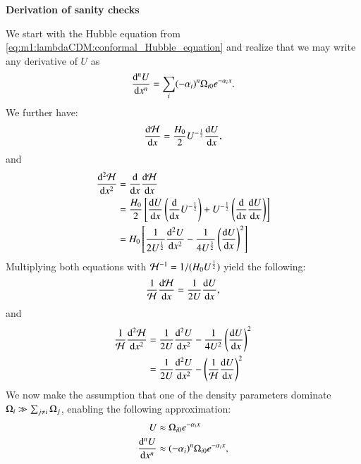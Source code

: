     \begin{tcolorbox}[
        width=1.025\linewidth,
        colback=blue!5!white,
        colframe=white
    ]
    \textbf{Derivation of sanity checks}

    We start with the Hubble equation from \cref{eq:m1:lambdaCDM:conformal_Hubble_equation} and realize that we may write any derivative of $U$ as
    \begin{equation*}
        \dv[n]{U}{x} = \sum_i(-\alpha_i)^n\Omega_{i0}e^{-\alpha_ix}.
    \end{equation*}
    We further have:
    \begin{equation*}
        \dv{\mathcal{H}}{x} = \frac{H_0}{2}U^{-\frac{1}{2}}\dv{U}{x},
    \end{equation*}
    and
    \begin{equation*}
        \begin{split}
            \dv[2]{\mathcal{H}}{x} &= \dv{}{x}\dv{\mathcal{H}}{x}\\
            &= \frac{H_0}{2}\left[\dv{U}{x}\left(\dv{}{x}U^{-\frac{1}{2}}\right) + U^{-\frac{1}{2}}\left(\dv{}{x}\dv{U}{x}\right)\right]\\
            &=H_0\left[\frac{1}{2U^{\frac{1}{2}}}\dv[2]{U}{x} - \frac{1}{4U^{\frac{3}{2}}}\left(\dv{U}{x}\right)^2\right]
        \end{split}
    \end{equation*}
    Multiplying both equations with $\mathcal{H}^{-1} = 1/(H_0U^{\frac{1}{2}})$ yield the following:
    \begin{equation*}
        \frac{1}{\mathcal{H}}\dv{\mathcal{H}}{x} = \frac{1}{2U}\dv{U}{x},
    \end{equation*}
    and 
    \begin{equation*}
        \begin{split}
            \frac{1}{\mathcal{H}}\dv[2]{\mathcal{H}}{x} &= \frac{1}{2U}\dv[2]{U}{x} - \frac{1}{4U^2}\left(\dv{U}{x}\right)^2 \\
            &= \frac{1}{2U}\dv[2]{U}{x}-\left(\frac{1}{\mathcal{H}}\dv{U}{x}\right)^2
        \end{split}
    \end{equation*}
    We now make the assumption that one of the density parameters dominate $\Omega_i\gg \sum_{j\neq i}\Omega_j$, enabling the following approximation:
    \begin{equation*}
        \begin{split}
            U &\approx \O_{i0}\expe{-\alpha_ix} \\
            \dv[n]{U}{x} &\approx (-\alpha_i)^n\O_{i0}\expe{-\alpha_ix},

\end{split}
\end{equation*}
\end{tcolorbox}
